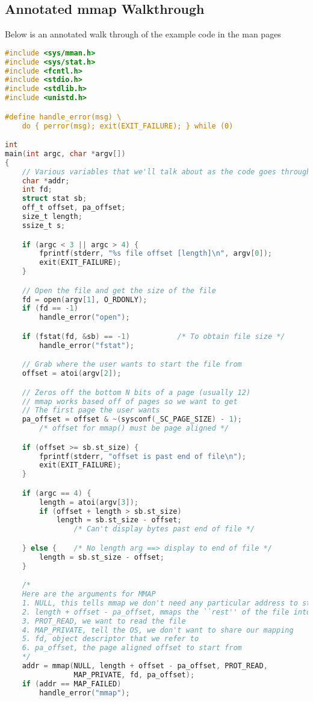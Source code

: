 \subsection{Annotated mmap Walkthrough}

Below is an annotated walk through of the example code in the man pages

\begin{lstlisting}[language=C]
#include <sys/mman.h>
#include <sys/stat.h>
#include <fcntl.h>
#include <stdio.h>
#include <stdlib.h>
#include <unistd.h>

#define handle_error(msg) \
    do { perror(msg); exit(EXIT_FAILURE); } while (0)

int
main(int argc, char *argv[])
{
    // Various variables that we'll talk about as the code goes through
    char *addr;
    int fd;
    struct stat sb;
    off_t offset, pa_offset;
    size_t length;
    ssize_t s;

    if (argc < 3 || argc > 4) {
        fprintf(stderr, "%s file offset [length]\n", argv[0]);
        exit(EXIT_FAILURE);
    }

    // Open the file and get the size of the file
    fd = open(argv[1], O_RDONLY);
    if (fd == -1)
        handle_error("open");

    if (fstat(fd, &sb) == -1)           /* To obtain file size */
        handle_error("fstat");

    // Grab where the user wants to start the file from
    offset = atoi(argv[2]);

    // Zeros off the bottom N bits of a page (usually 12)
    // mmap works based off of pages so we want to get
    // The first page the user wants
    pa_offset = offset & ~(sysconf(_SC_PAGE_SIZE) - 1);
        /* offset for mmap() must be page aligned */

    if (offset >= sb.st_size) {
        fprintf(stderr, "offset is past end of file\n");
        exit(EXIT_FAILURE);
    }

    if (argc == 4) {
        length = atoi(argv[3]);
        if (offset + length > sb.st_size)
            length = sb.st_size - offset;
                /* Can't display bytes past end of file */

    } else {    /* No length arg ==> display to end of file */
        length = sb.st_size - offset;
    }

    /*
    Here are the arguments for MMAP
    1. NULL, this tells mmap we don't need any particular address to start from
    2. length + offset - pa_offset, mmaps the ``rest'' of the file into memory (starting form offset)
    3. PROT_READ, we want to read the file
    4. MAP_PRIVATE, tell the OS, we don't want to share our mapping
    5. fd, object descriptor that we refer to
    6. pa_offset, the page aligned offset to start from
    */
    addr = mmap(NULL, length + offset - pa_offset, PROT_READ,
                MAP_PRIVATE, fd, pa_offset);
    if (addr == MAP_FAILED)
        handle_error("mmap");


\end{lstlisting}
